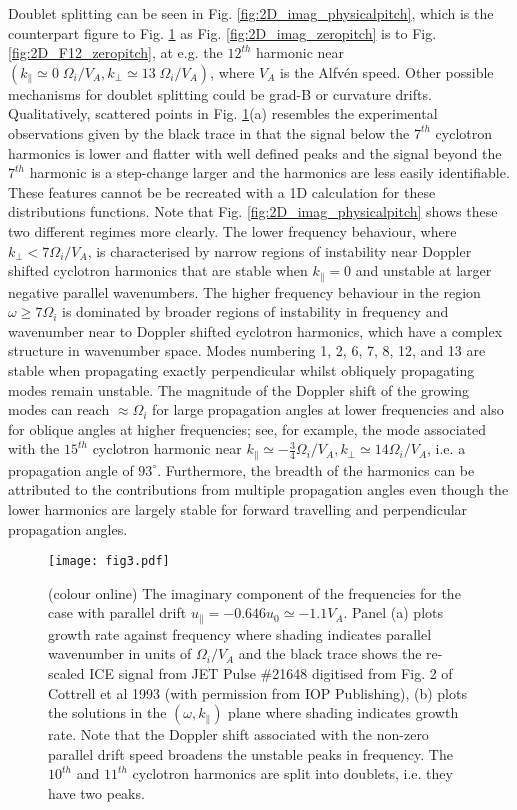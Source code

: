 \documentclass[12pt]{iopart}
\begin{document}
Doublet splitting can be seen in Fig. \ref{fig:2D_imag_physicalpitch}, which is the
counterpart figure to Fig. \ref{fig:2D_F12_physicalpitch} as Fig.
\ref{fig:2D_imag_zeropitch} is to Fig. \ref{fig:2D_F12_zeropitch},
at e.g. the $12^{th}$ harmonic  near $(k_\parallel \simeq 0\; \Omega_{i}/V_A,
k_\bot \simeq 13\; \Omega_{i}/V_A)$, where $V_A$ is the Alfv{\'e}n speed.
Other possible mechanisms for doublet splitting could be grad-B or curvature
drifts\cite{Cottrell1993,Fulop1998}. Qualitatively, scattered points in Fig.
\ref{fig:2D_F12_physicalpitch}(a) resembles the experimental observations given
by the black trace in that the
signal below the $7^{th}$ cyclotron harmonics is lower and flatter with well
defined peaks and the signal beyond the $7^{th}$ harmonic is a step-change
larger and the harmonics are less easily identifiable. These features cannot be
be recreated with a 1D calculation for these distributions functions. Note that
Fig. \ref{fig:2D_imag_physicalpitch} shows these two different regimes more
clearly. The lower frequency behaviour, where $k_\perp < 7 \Omega_i/V_A$, is
characterised by narrow regions of instability near Doppler shifted cyclotron
harmonics that are stable when $k_\parallel=0$ and unstable at larger
negative parallel wavenumbers. The higher frequency behaviour in the region
$\omega\geq 7\Omega_i$ is dominated by broader regions of instability in
frequency and wavenumber near to Doppler shifted cyclotron harmonics, which have
a complex structure in wavenumber space. Modes numbering 1, 2, 6, 7, 8, 12, and
13 are stable when propagating exactly perpendicular whilst obliquely
propagating modes remain unstable. The magnitude of the Doppler shift of
the growing modes can reach $\approx \Omega_i$ for large propagation angles at 
lower frequencies and also for
oblique angles at higher frequencies; see, for example, the mode
associated with the $15^{th}$ cyclotron harmonic near $k_\parallel \simeq
-\frac{3}{4} \Omega_i/V_A, k_\perp \simeq 14 \Omega_i/V_A$, i.e. a propagation
angle of $93^\circ$. Furthermore, the breadth of the harmonics can be
attributed to the contributions from multiple propagation angles even though the
lower harmonics are largely stable for forward travelling and perpendicular
propagation angles.

\begin{figure}[ht!]
    \raggedleft
\texttt{[image: fig3.pdf]}
    \caption{(colour online) The imaginary component of the frequencies for the
    case with parallel drift $u_{\parallel} = -0.646 u_0 \simeq -1.1 V_A$.
    Panel (a) plots growth rate against frequency where shading indicates
    parallel wavenumber in units of $\Omega_i/V_A$ and the black trace shows
    the re-scaled ICE signal from JET Pulse \#21648 digitised from Fig. 2 of
    Cottrell et al 1993 (with permission from IOP Publishing), (b) plots the solutions
    in the $(\omega,k_\parallel)$ plane where shading indicates growth rate. Note
    that the Doppler shift associated with the non-zero parallel drift speed
    broadens the unstable peaks in frequency. The $10^{th}$ and $11^{th}$ cyclotron
    harmonics are split into doublets, i.e. they have two peaks.}
    \label{fig:2D_F12_physicalpitch}
\end{figure}
\end{document}
